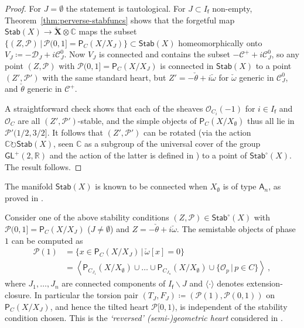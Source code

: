 \documentclass[reqno,a4paper]{amsart}
\newcommand{\calC}{\mathcal{C}}
\newcommand{\calD}{\mathcal{D}}
\newcommand{\calP}{\mathcal{P}}
\newcommand{\C}{\mathbb{C}}
\newcommand{\R}{\mathbb{R}}
\newcommand{\scrO}{\mathscr{O}}
\newcommand{\sfA}{\mathsf{A}}
\newcommand{\sff}{\mathsf{f}}
\newcommand{\bfX}{\mathbf{X}}
\newcommand{\half}{1/2}
\newcommand{\catP}{\mathsf{P}}
\newcommand{\catPC}{\mathsf{P}_{C}}
\newcommand{\Stab}{\mathsf{Stab}}
\newcommand{\Lomega}{\check{\omega}}
\newcommand{\Ltheta}{\check{\theta}}
\newcommand{\weightlattice}{\bfX}
\newcommand{\coweightlattice}{\check{\weightlattice}}
\newcommand{\rsv}{X}
\newcommand{\ssv}{X_\emptyset}
\newcommand{\psv}{X_J}
\newcommand{\GL}{\mathsf{GL}}
\theoremstyle{basic-theorem}
\numberwithin{equation}{section}
\begin{document}
\begin{proof}
    For $J=\emptyset$ the statement is tautological. For $J\subset I_\sff$ non-empty, Theorem~\ref{thm:perverse-stabfuncs} shows that the forgetful map $\Stab(\rsv)\to \coweightlattice\otimes \C$ maps the subset $\{(Z,\calP)\,\vert\, \calP(0,1]=\catPC(\rsv/\psv)\}\subset \Stab(\rsv)$ homeomorphically onto $V_J\coloneqq-\calD_J+i\calC_J^0$. Now $V_J$ is connected and contains the subset $-\calC^++i\calC_J^0$, so any point $(Z,\calP)$ with $\calP(0,1]=\catPC(\rsv/\psv)$ is connected in $\Stab(\rsv)$ to a point $(Z', \calP')$ with the same standard heart, but $Z' =-\Ltheta + i\Lomega$ for $\Lomega$ generic in $\calC_J^0$, and $\Ltheta$ generic in $\calC^+$.
    
    A straightforward check shows that each of the sheaves $\scrO_{C_i}(-1)$ for $i\in I_\sff$ and $\scrO_{C}$ are all $(Z',\calP')$-stable, and the simple objects of $\catPC(\rsv/\ssv)$ thus all lie in $\calP'(\half, 3/2]$. It
    follows that $(Z',\calP')$ can be rotated (via the action $\C\circlearrowright \Stab(\rsv)$, seen $\C$ as a subgroup of the universal cover of the group $\GL^+(2,\R)$ and the action of the latter is defined in \cite[Lemma~8.2]{B07}) to a point of $\Stab^\circ (\rsv)$. The result follows.
\end{proof}

\begin{remark}
    The manifold $\Stab(\rsv)$ is known to be connected when $\ssv$ is of type $\sfA_n$, as proved in \cite{ishiiStabilityConditionsAnSingularities}.
\end{remark}

Consider one of the above stability conditions $(Z,\calP)\in \Stab^\circ(\rsv)$ with $\calP(0,1]=\catPC(\rsv/\psv)$ ($J\neq \emptyset$) and $Z=-\Ltheta + i\Lomega$. The semistable objects of phase $1$ can be computed as
\begin{align}
    \calP(1)&=\{x\in \catPC(\rsv/\psv)\,\vert\, \Lomega[x]=0\} \\
            &=\left\langle \catP_{C_{J_1}}(\rsv/\ssv) \cup \ldots\cup \catP_{C_{J_n}}(\rsv/\ssv)\cup \{\scrO_p\,\vert\, p\in C\} \right\rangle\ ,
\end{align}
where $J_1,\ldots,J_n$ are connected components of $I_\sff\smallsetminus J$ and $\langle\cdot\rangle$ denotes extension-closure. In particular the torsion pair $(T_J,F_J)\coloneq(\calP(1), \calP(0,1))$ on $\catPC(\rsv/\psv)$, and hence the tilted heart $\calP[0,1)$, is independent of the stability condition chosen. This is the \textit{`reversed' (semi-)geometric heart} considered in \cite[\S5.5]{Shimpi_Torsion_pairs}.
\end{document}
